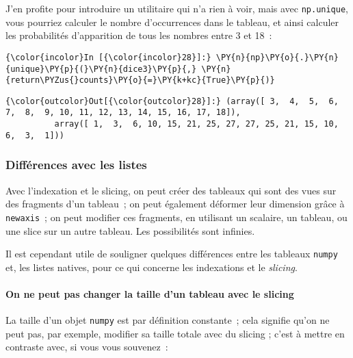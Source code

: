     J'en profite pour introduire un utilitaire qui n'a rien à voir, mais
avec \texttt{np.unique}, vous pourriez calculer le nombre d'occurrences
dans le tableau, et ainsi calculer les probabilités d'apparition de tous
les nombres entre 3 et 18~:

    \begin{Verbatim}[commandchars=\\\{\}]
{\color{incolor}In [{\color{incolor}28}]:} \PY{n}{np}\PY{o}{.}\PY{n}{unique}\PY{p}{(}\PY{n}{dice3}\PY{p}{,} \PY{n}{return\PYZus{}counts}\PY{o}{=}\PY{k+kc}{True}\PY{p}{)}
\end{Verbatim}


\begin{Verbatim}[commandchars=\\\{\}]
{\color{outcolor}Out[{\color{outcolor}28}]:} (array([ 3,  4,  5,  6,  7,  8,  9, 10, 11, 12, 13, 14, 15, 16, 17, 18]),
          array([ 1,  3,  6, 10, 15, 21, 25, 27, 27, 25, 21, 15, 10,  6,  3,  1]))
\end{Verbatim}
            
    \hypertarget{diffuxe9rences-avec-les-listes}{%
\subsubsection{Différences avec les
listes}\label{diffuxe9rences-avec-les-listes}}

    Avec l'indexation et le slicing, on peut créer des tableaux qui sont des
vues sur des fragments d'un tableau~; on peut également déformer leur
dimension grâce à \texttt{newaxis}~; on peut modifier ces fragments, en
utilisant un scalaire, un tableau, ou une slice sur un autre tableau.
Les possibilités sont infinies.

    Il est cependant utile de souligner quelques différences entre les
tableaux \texttt{numpy} et, les listes natives, pour ce qui concerne les
indexations et le \emph{slicing}.

    \hypertarget{on-ne-peut-pas-changer-la-taille-dun-tableau-avec-le-slicing}{%
\paragraph{On ne peut pas changer la taille d'un tableau avec le
slicing}\label{on-ne-peut-pas-changer-la-taille-dun-tableau-avec-le-slicing}}

La taille d'un objet \texttt{numpy} est par définition constante~; cela
signifie qu'on ne peut pas, par exemple, modifier sa taille totale avec
du slicing ; c'est à mettre en contraste avec, si vous vous souvenez~:

